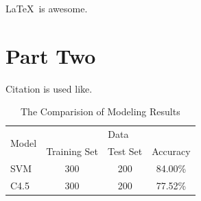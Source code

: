 \documentclass[12pt,english, openany]{book}
\begin{document}
	
	
	\LaTeX~is awesome. \lipsum[1]
	
	\vspace{0.6cm}
	\begin{tcolorbox}[title=\textbf{tcolorbox example}]
		\lipsum[2]
	\end{tcolorbox}
	
	\chapter{Part Two}
	Citation is used like\cite{ex}.
	\begin{table}[b]
		\centering
		\begin{tabular}{lccc}
			\toprule
			\multirow{2}{*}{Model} & \multicolumn{3}{c}{Data} \\ \cmidrule(lr){2-4}
			& Training Set &  Test Set &  Accuracy \\
			\midrule
			SVM & 300 & 200 & 84.00\% \\
			C4.5 & 300 & 200 & 77.52\% \\
			\bottomrule
		\end{tabular}
		\caption{The Comparision of Modeling Results}
		\label{tab-label-2}
	\end{table}
	
\end{document}

